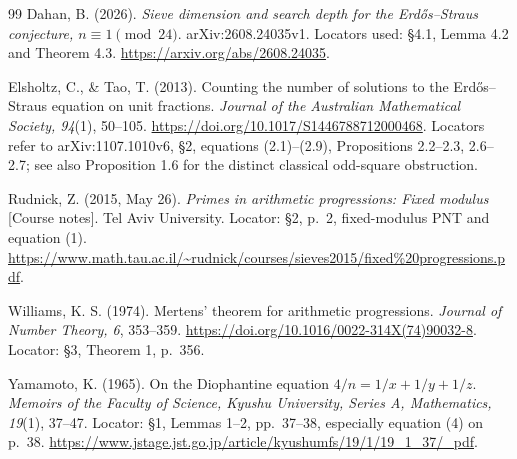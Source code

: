 \documentclass[11pt]{article}
\theoremstyle{remark}\newtheorem{remark}[theorem]{Remark}
\begin{document}
\begin{thebibliography}{99}
Dahan, B. (2026). \emph{Sieve dimension and search depth for the Erd\H{o}s--Straus conjecture, $n\equiv1\pmod{24}$}. arXiv:2608.24035v1. Locators used: \S4.1, Lemma 4.2 and Theorem 4.3. \url{https://arxiv.org/abs/2608.24035}.

Elsholtz, C., \& Tao, T. (2013). Counting the number of solutions to the Erd\H{o}s--Straus equation on unit fractions. \emph{Journal of the Australian Mathematical Society, 94}(1), 50--105. \url{https://doi.org/10.1017/S1446788712000468}. Locators refer to arXiv:1107.1010v6, \S2, equations (2.1)--(2.9), Propositions 2.2--2.3, 2.6--2.7; see also Proposition 1.6 for the distinct classical odd-square obstruction.

Rudnick, Z. (2015, May 26). \emph{Primes in arithmetic progressions: Fixed modulus} [Course notes]. Tel Aviv University. Locator: \S2, p.~2, fixed-modulus PNT and equation (1). \url{https://www.math.tau.ac.il/~rudnick/courses/sieves2015/fixed\%20progressions.pdf}.

Williams, K. S. (1974). Mertens' theorem for arithmetic progressions. \emph{Journal of Number Theory, 6}, 353--359. \url{https://doi.org/10.1016/0022-314X(74)90032-8}. Locator: \S3, Theorem 1, p.~356.

Yamamoto, K. (1965). On the Diophantine equation $4/n=1/x+1/y+1/z$. \emph{Memoirs of the Faculty of Science, Kyushu University, Series A, Mathematics, 19}(1), 37--47. Locator: \S1, Lemmas 1--2, pp.~37--38, especially equation (4) on p.~38. \url{https://www.jstage.jst.go.jp/article/kyushumfs/19/1/19_1_37/_pdf}.
\end{thebibliography}
\end{document}
